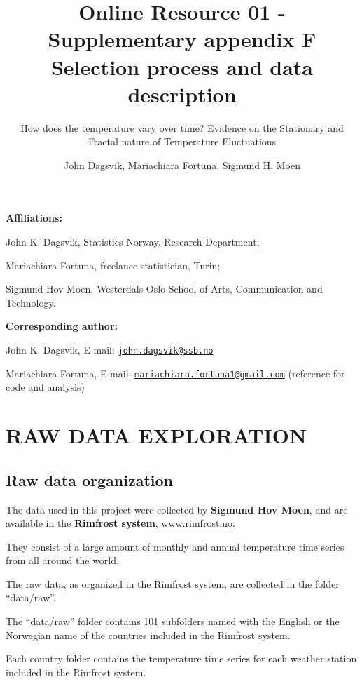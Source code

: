 \documentclass[]{article}
\title{Online Resource 01 - Supplementary appendix F Selection process and data
description}
\subtitle{How does the temperature vary over time? Evidence on the Stationary and
Fractal nature of Temperature Fluctuations}
\author{John Dagsvik, Mariachiara Fortuna, Sigmund H. Moen}
\date{}
\begin{document}
\maketitle

\vspace{8.5cm}

\textbf{Affiliations:}

John K. Dagsvik, Statistics Norway, Research Department;

Mariachiara Fortuna, freelance statistician, Turin;

Sigmund Hov Moen, Westerdals Oslo School of Arts, Communication and
Technology.

\vspace{0.5cm}

\textbf{Corresponding author:}

John K. Dagsvik, E-mail:
\href{mailto:john.dagsvik@ssb.no}{\nolinkurl{john.dagsvik@ssb.no}}

Mariachiara Fortuna, E-mail:
\href{mailto:mariachiara.fortuna1@gmail.com}{\nolinkurl{mariachiara.fortuna1@gmail.com}}
(reference for code and analysis)

\newpage

\newpage

\hypertarget{raw-data-exploration}{%
\section{RAW DATA EXPLORATION}\label{raw-data-exploration}}

\hypertarget{raw-data-organization}{%
\subsection{Raw data organization}\label{raw-data-organization}}

The data used in this project were collected by \textbf{Sigmund Hov
Moen}, and are available in the \textbf{Rimfrost system},
\href{http://www.rimfrost.no/}{www.rimfrost.no}.

They consist of a large amount of monthly and annual temperature time
series from all around the world.

The raw data, as organized in the Rimfrost system, are collected in the
folder ``data/raw''.

The ``data/raw'' folder contains 101 subfolders named with the English
or the Norwegian name of the countries included in the Rimfrost system.

Each country folder contains the temperature time series for each
weather station included in the Rimfrost system.
\end{document}
